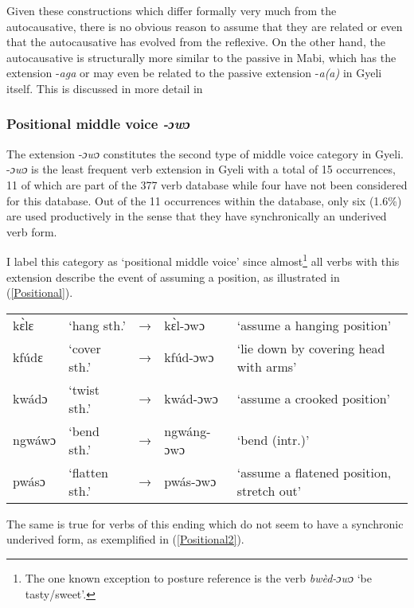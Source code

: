 Given these constructions which differ formally very much from the autocausative, there is no obvious reason to assume that they are related or even that the autocausative has evolved from the reflexive. On the other hand, the autocausative is structurally more similar to the passive in Mabi, which has the extension -{\itshape aga} or may even be related to the passive extension -{\itshape a(a)} in Gyeli itself. This is discussed in more detail in 


\subsubsection{Positional middle voice \textit{-ɔwɔ}}
\label{sec:PosVerbs}

The extension -{\itshape ɔwɔ} constitutes the second type of middle voice category in Gyeli. -{\itshape ɔwɔ} is the least frequent verb extension in Gyeli with a total of 15 occurrences, 11 of which are part of the 377 verb database while four have not been considered for this database. Out of the 11 occurrences within the database, only six (1.6\%) are used productively in the sense that they have synchronically an underived verb form.  

I label this category as ‘positional middle voice’ since almost\footnote{The one known exception to posture reference is the verb {\itshape bwèd-ɔwɔ} `be tasty/sweet'. } all verbs with this extension describe the event of assuming a position, as illustrated in (\ref{Positional}). 

\begin{exe} \ex \label{Positional}
\begin{tabular}{llllp{4cm}}
kɛ̀lɛ & `hang sth.' & → & kɛ̀l-ɔwɔ & `assume a hanging position' \\
kfúdɛ & `cover sth.' & → & kfúd-ɔwɔ & `lie down by covering head with arms' \\
kwádɔ & `twist sth.' & → & kwád-ɔwɔ & `assume a crooked position' \\
ngwáwɔ & `bend sth.' & → & ngwáng-ɔwɔ & `bend (intr.)' \\
pwásɔ & `flatten sth.' & → & pwás-ɔwɔ & `assume a flatened position, stretch out' \\
\end{tabular}
\end{exe}

\noindent The same is true for verbs of this ending which do not seem to have a synchronic underived form, as exemplified in (\ref{Positional2}).



